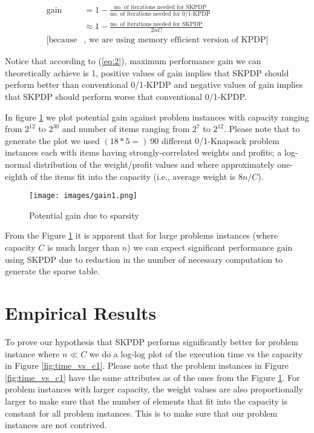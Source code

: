 \begin{align}
  \label{eq:2}
  \text{gain} &= 1 - \frac{\text{no.\ of iterations needed for
                SKPDP}}{\text{no.\ of iterations needed for 0/1-KPDP}}
                \nonumber \\
              &\approx 1 - \frac{\text{no. of iterations needed for
                SKPDP}}{2nC} \\
  [\text{because}&\text{, we are using memory efficient version of KPDP}]
                   \nonumber
\end{align}

Notice that according to (\ref{eq:2}), maximum performance gain we can
theoretically achieve is 1, positive values of gain implies that SKPDP should
perform better than conventional 0/1-KPDP and negative values of gain implies
that SKPDP should perform worse that conventional 0/1-KPDP.

In figure \ref{fig:gain1} we plot potential gain against problem instances
with capacity ranging from $2^{12}$ to $2^{30}$ and number of items ranging
from $2^7$ to $2^{12}$.  Please note that to generate the plot we used
$(18*5=)\ 90$ different 0/1-Knapsack problem instances each with items having
strongly-correlated weights and profits; a log-normal distribution of the
weight/profit values and where approximately one-eighth of the items fit into
the capacity (i.e., average weight is $8n/C$).

\begin{figure}[htbp]
\centerline{\texttt{[image: images/gain1.png]}}
\caption{Potential gain due to sparsity}
\label{fig:gain1}
\end{figure}

From the Figure \ref{fig:gain1} it is apparent that for large problems
instances (where capacity $C$ is much larger than $n$) we can expect
significant performance gain using SKPDP due to reduction in the number of
necessary computation to generate the sparse table.

\section{Empirical Results}
To prove our hypothesis that SKPDP performs significantly better for problem
instance where $n \ll C$ we do a log-log plot of the execution time vs the
capacity in Figure \ref{fig:time_vs_c1}.  Please note that the problem
instances in Figure \ref{fig:time_vs_c1} have the same attributes as of the
ones from the Figure \ref{fig:gain1}.  For problem instances with larger
capacity, the weight values are also proportionally larger to make sure that
the number of elements that fit into the capacity is constant for all problem
instances.  This is to make sure that our problem instances are not contrived.
 
